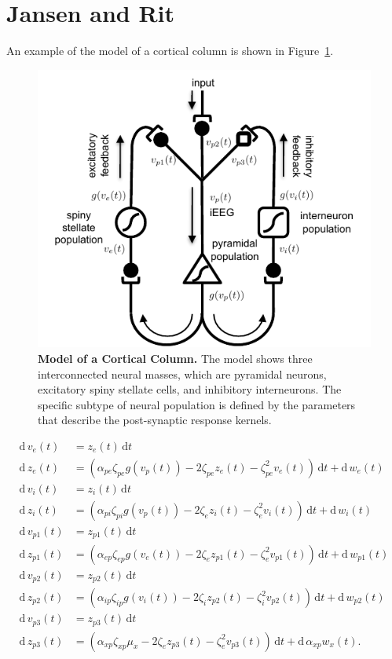 \documentclass[]{article}
\begin{document}
\section{Jansen and Rit}
An example of the model of a cortical column is shown in Figure~\ref{fig:JansenAndRit}.
\begin{figure}[ht]
	\centering
		\includegraphics[scale=1]{./Figures/pdf/JansenAndRit.pdf}
	\caption{\textbf{Model of a Cortical Column.} The model shows three interconnected neural masses, which are pyramidal neurons, excitatory spiny stellate cells, and inhibitory interneurons. The specific subtype of neural population is defined by the parameters that describe the post-synaptic response kernels.}
	\label{fig:JansenAndRit}
\end{figure}

\begin{align}
	\mathrm{d}\,v_e(t) &= z_e(t)\,\mathrm{d}t \\
	\mathrm{d}\,z_e(t) &= (\alpha_{pe}\zeta_{pe}g\left(v_p(t)\right) - 2\zeta_{pe}z_e(t) - \zeta_{pe}^2v_e(t))\,\mathrm{d}t + \mathrm{d}\,w_e(t) \\
	\mathrm{d}\,v_i(t) &= z_i(t)\,\mathrm{d}t \\
	\mathrm{d}\,z_i(t) &= \left(\alpha_{pi}\zeta_{pi}g\left(v_p(t)\right) - 2\zeta_{e}z_i(t) - \zeta_{e}^2v_i(t)\right)\,\mathrm{d}t + \mathrm{d}\,w_i(t)\\
	\mathrm{d}\,v_{p1}(t) &= z_{p1}(t)\,\mathrm{d}t \\
	\mathrm{d}\,z_{p1}(t) &= (\alpha_{ep}\zeta_{ep}g\left(v_e(t)\right) - 2\zeta_{e}z_{p1}(t) - \zeta_{e}^2v_{p1}(t))\,\mathrm{d}t + \mathrm{d}\, w_{p1}(t)\\
	\mathrm{d}\,v_{p2}(t) &= z_{p2}(t)\,\mathrm{d}t \\
	\mathrm{d}\,z_{p2}(t) &= (\alpha_{ip}\zeta_{ip}g\left(v_i(t)\right) - 2\zeta_{i}z_{p2}(t) - \zeta_{i}^2v_{p2}(t))\,\mathrm{d}t  + \mathrm{d}\, w_{p2}(t) \\
	\mathrm{d}\,v_{p3}(t) &= z_{p3}(t)\,\mathrm{d}t \\
	\mathrm{d}\,z_{p3}(t) &= (\alpha_{xp}\zeta_{xp}\mu_x - 2\zeta_{e}z_{p3}(t) - \zeta_{e}^2v_{p3}(t))\,\mathrm{d}t + \mathrm{d}\,\alpha_{xp}w_x(t).
\end{align}
\end{document}
